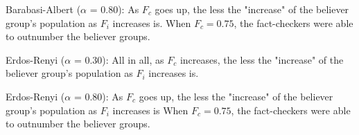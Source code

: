 \documentclass{article}
\begin{document}
Barabasi-Albert ($\alpha$ = 0.80): As $F_c$ goes up, the less the "increase" of the believer group's population as $F_i$ increases is.
When $F_c = 0.75$,  the fact-checkers were able to outnumber the believer groups.

Erdos-Renyi ($\alpha$ = 0.30): All in all, as $F_c$ increases, the less the "increase" of the believer group's population as $F_i$ increases is.

Erdos-Renyi ($\alpha$ = 0.80): As $F_c$ goes up, the less the "increase" of the believer group's population as $F_i$ increases is
When $F_c = 0.75$,  the fact-checkers were able to outnumber the believer groups.

%
%
%
%
%
\end{document}
